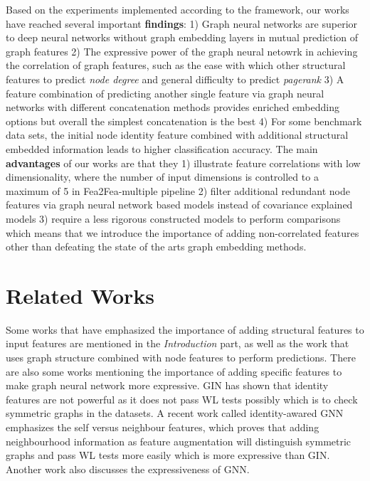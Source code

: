 \documentclass[runningheads]{llncs}
\newcommand{\xhdr}[1]{\vspace{1.7mm}\noindent{{\bf #1}}}
\begin{document}
Based on the experiments implemented according to the framework, our works have reached several important \textbf{findings}: 1) Graph neural networks are superior to deep neural networks without graph embedding layers in mutual prediction of graph features  2) The expressive power of the graph neural netowrk in achieving the correlation of graph features, such as the ease with which other structural features  to predict \textit{node degree} and general difficulty to predict \textit{pagerank} 3) A feature combination  of predicting another single feature via graph neural networks with different concatenation methods provides enriched embedding options but overall the simplest concatenation is the best 4) For some benchmark data sets, the initial node identity feature combined with additional structural embedded information leads to higher classification accuracy.
The main \textbf{advantages} of our works are that they 
1) illustrate feature correlations with low dimensionality, where the number of input dimensions is controlled to a maximum of 5 in Fea2Fea-multiple pipeline
2) filter additional redundant node features via graph neural network based models instead of covariance explained models
3) require a less rigorous constructed models to perform comparisons which means that we introduce the importance of adding non-correlated features other than defeating the state of the arts graph embedding methods.

\vspace{-0.5cm}
\section{Related Works}
\vspace{-0.52cm}
\xhdr{GNN expressiveness}
Some works that have emphasized the importance of adding structural features to input features are mentioned in the \textit{Introduction} part, as well as the work \cite{lerique2019joint} that uses graph structure combined with node features to perform predictions. There are also some works mentioning the importance of adding specific features to make graph neural network more expressive. GIN \cite{xu2018powerful} has shown that identity features are not powerful as it does not pass WL tests possibly which is to check symmetric graphs in the datasets. A recent work called identity-awared GNN \cite{you2021identityaware} emphasizes the self versus neighbour features, which proves that adding neighbourhood information as feature augmentation will distinguish symmetric graphs and pass WL tests more easily which is more expressive than GIN. Another work \cite{sato2020survey} also discusses the expressiveness of GNN. 
\end{document}
